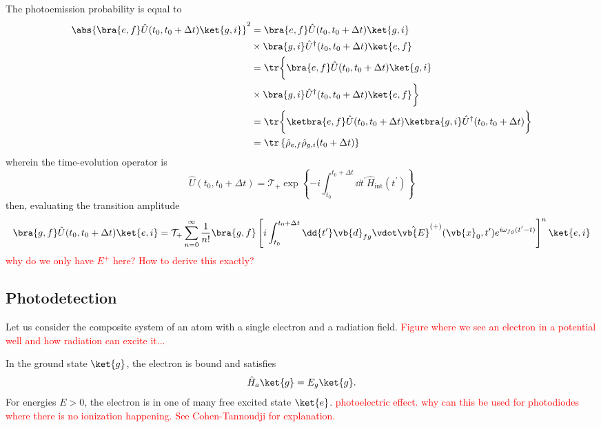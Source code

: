 The photoemission probability is equal to
\begin{equation}
	\begin{split}
		\abs{\bra{e,f}\hat{U}(t_0,t_0+\Delta t)\ket{g,i}}^2
		&=
		\bra{e,f}
		\hat{U}(t_0,t_0+\Delta t)
		\ket{g,i}
		\\
		&\times
		\bra{g,i}
		\hat{U}^\dagger(t_0,t_0+\Delta t)
		\ket{e,f}
		\\
		&=
		\tr\biggl\{
			\bra{e,f}
			\hat{U}(t_0,t_0+\Delta t)
			\ket{g,i}
			\\
			&\times
			\bra{g,i}
			\hat{U}^\dagger(t_0,t_0+\Delta t)
			\ket{e,f}
		\biggr\}
		\\
		&=
		\tr\biggl\{
			\ketbra{e,f}
			\hat{U}(t_0,t_0+\Delta t)
			\ketbra{g,i}
			\hat{U}^\dagger(t_0,t_0+\Delta t)
		\biggr\}
		\\
		&=
		\tr\left\{
			\hat\rho_{e,f}
			\hat\rho_{g,i}(t_0+\Delta t)
		\right\}
	\end{split}
\end{equation}
wherein the time-evolution operator is
\begin{equation}
	\hat{U}(t_0,t_0+\Delta t)
	=
	\mathcal{T}_+
	\exp\left\{
		-i
		\int_{t_0}^{t_0+\Delta t}\dd{t^\prime}
		\hat{H}_\text{int}(t^\prime)
	\right\}
\end{equation}
then, evaluating the transition amplitude
\begin{equation}
	\bra{g,f}
	\hat{U}(t_0,t_0+\Delta t)
	\ket{e,i}
	=
	\mathcal{T}_+
	\sum_{n=0}^\infty
	\frac{1}{n!}
	\bra{g,f}
	\left[
		i
		\int_{t_0}^{t_0+\Delta t}\dd{t^\prime}
		\vb{d}_{fg}
		\vdot
		\hat{\vb{E}}^{(+)}(\vb{x}_0,t^\prime)
		e^{i\omega_{fg}(t^\prime-t)}
	\right]^n
	\ket{e,i}
\end{equation}
\textcolor{red}{why do we only have $E^+$ here? How to derive this exactly?}

\subsection{Photodetection}

Let us consider the composite system of an atom with a single electron and a radiation field.
\textcolor{red}{Figure where we see an electron in a potential well and how radiation can excite it...}

In the ground state $\ket{g}$, the electron is bound and satisfies
\begin{equation}
	\hat{H}_a
	\ket{g}
	=
	E_g
	\ket{g}
	.
\end{equation}
For energies $E>0$, the electron is in one of many free excited state $\ket{e}$.
\textcolor{red}{photoelectric effect. why can this be used for photodiodes where there is no ionization happening. See Cohen-Tannoudji for explanation.}

